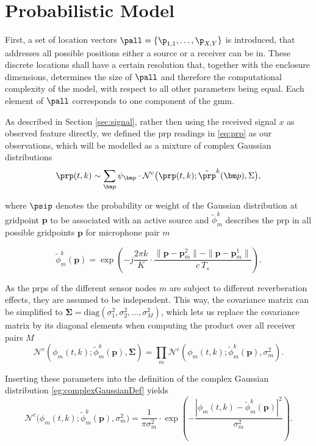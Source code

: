 \section{Probabilistic Model} \label{sec:prob_model}

First, a set of location vectors $\pall=\{\p_{1,1},\dots,\p_{X,Y}\}$ is introduced, that addresses all possible positions either a source or a receiver can be in. These discrete locations shall have a certain resolution that, together with the enclosure dimensions, determines the size of $\pall$ and therefore the computational complexity of the model, with respect to all other parameters being equal. Each element of $\pall$ corresponds to one component of the \gls{gmm}.


As described in Section \ref{sec:signal}, rather then using the received signal $x$ as observed feature directly, we defined the \gls{prp} readings in \eqref{eq:prp} as our observations, which will be modelled as a mixture of complex Gaussian distributions
\begin{equation}
	\prp(t,k)\sim\sum_{\bm p}\psi_{\bm p}\cdot\mathcal{N}^c\big(\prp(t,k);\tilde\prp^k(\bm p),\Sigma\big),
\label{eq:phi_gmm}
\end{equation}

where $\psip$ denotes the probability or weight of the Gaussian distribution at gridpoint $\bm p$ to be associated with an active source and $\tilde\phi^k_m$ describes the \gls{prp} in all possible gridpoints $\bm p$ for microphone pair $m$

\begin{equation}
    \tilde\phi^k_m(\bm p)=\exp{\left (-j\frac{2\pi k}{K}\cdot\frac{\|\bm p-\bm p^2_m\|-\|\bm p-\bm p^1_m\|}{c\ T_s}\right )}.
\label{eq:phi_tilde}
\end{equation}

As the \glspl{prp} of the different sensor nodes $m$ are subject to different reverberation effects, they are assumed to be independent. This way, the covariance matrix can be simplified to $\bm\Sigma=\text{diag}(\sigma^2_{1}, \sigma^2_{2}, \dots, \sigma^2_{M})$, which lets us replace the covariance matrix by its diagonal elements when computing the product over all receiver pairs $M$
\begin{equation}
    \mathcal{N}^c(\phi_m(t,k);\tilde\phi^k_m(\bm p),\bm\Sigma)=\prod_m \mathcal{N}^c(\phi_m(t,k);\tilde\phi^k_m(\bm p),\sigma^2_m).
\end{equation}

Inserting these parameters into the definition of the complex Gaussian distribution \eqref{eg:complexGaussianDef} yields
\begin{equation}
    \mathcal{N}^c\big(\phi_m(t,k);\tilde\phi_m^k(\bm p),\sigma_{m}^2\big)=\frac{1}{\pi\sigma_{m}^2}\cdot\exp\left (-\frac{\left|\phi_m(t,k)-\tilde\phi_m^k(\bm p)\right|^2}{\sigma_{m}^2} \right ).
\label{eq:gaussian}
\end{equation}

